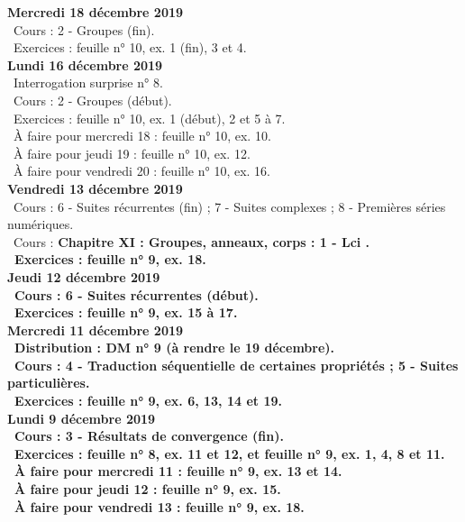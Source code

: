 \documentclass[12pt,a4paper]{article}
\begin{document}
\noindent\textbf{\bf Mercredi 18 décembre 2019}\\
\bu\ Cours : 2 - Groupes (fin).\\ 
\bu\ Exercices : feuille n° 10, ex. 1 (fin), 3 et 4.\vspace{.4cm}\\
 
\noindent\textbf{Lundi 16 décembre 2019}\\
\bu\ Interrogation surprise n° 8.\\
\bu\ Cours : 2 - Groupes (début).\\ 
\bu\ Exercices : feuille n° 10, ex. 1 (début), 2 et 5 à 7.\\
\bu\ À faire pour mercredi 18 : feuille n° 10, ex. 10.\\
\bu\ À faire pour jeudi 19 : feuille n° 10, ex. 12.\\
\bu\ À faire pour vendredi 20 : feuille n° 10, ex. 16.\vspace{.4cm}\\ 

\noindent\textbf{Vendredi 13 décembre 2019}\\
\bu\ Cours : 6 - Suites récurrentes (fin) ; 7 - Suites complexes ; 8 - Premières séries numériques.\\
\bu\ Cours : \bf Chapitre XI \rm : Groupes, anneaux, corps  : 1 - Lci .\\ 
\bu\ Exercices : feuille n° 9, ex. 18.\vspace{.4cm}\\

\noindent\textbf{Jeudi 12 décembre 2019}\\
\bu\ Cours : 6 - Suites récurrentes (début).\\
\bu\ Exercices : feuille n° 9, ex. 15 à 17.\vspace{.4cm}\\ 
 
\noindent\textbf{\bf Mercredi 11 décembre 2019}\\
\bu\ Distribution : DM n° 9 (à rendre le 19 décembre).\\
\bu\ Cours : 4 - Traduction séquentielle de certaines propriétés ; 5 - Suites particulières.\\
\bu\ Exercices : feuille n° 9, ex. 6, 13, 14 et 19.\vspace{.4cm}\\ 

\noindent\textbf{Lundi 9 décembre 2019}\\
\bu\ Cours : 3 - Résultats de convergence (fin).\\
\bu\ Exercices : feuille n° 8, ex. 11 et 12, et feuille n° 9, ex. 1, 4, 8 et 11.\\ 
\bu\ À faire pour mercredi 11 : feuille n° 9, ex. 13 et 14.\\
\bu\ À faire pour jeudi 12 : feuille n° 9, ex. 15.\\
\bu\ À faire pour vendredi 13 : feuille n° 9, ex. 18.\vspace{.4cm}\\
\end{document}
